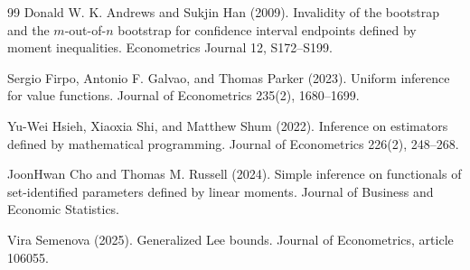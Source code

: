 \documentclass{article}
\begin{document}
\begin{thebibliography}{99}
   Donald W. K. Andrews and Sukjin Han (2009). Invalidity of the bootstrap and the \(m\)-out-of-\(n\) bootstrap for confidence interval endpoints defined by moment inequalities. Econometrics Journal 12, S172--S199.

   Sergio Firpo, Antonio F. Galvao, and Thomas Parker (2023). Uniform inference for value functions. Journal of Econometrics 235(2), 1680--1699.

   Yu-Wei Hsieh, Xiaoxia Shi, and Matthew Shum (2022). Inference on estimators defined by mathematical programming. Journal of Econometrics 226(2), 248--268.

   JoonHwan Cho and Thomas M. Russell (2024). Simple inference on functionals of set-identified parameters defined by linear moments. Journal of Business and Economic Statistics.

   Vira Semenova (2025). Generalized Lee bounds. Journal of Econometrics, article 106055.

\end{thebibliography}
\end{document}
